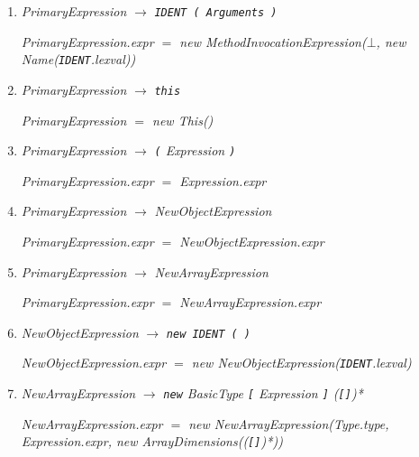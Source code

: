 \documentclass[12pt,a4paper]{scrartcl}
\renewcommand{\prod}[2]{\textit{#1} $\rightarrow$ \textit{#2}}
\newcommand{\tok}[1]{\textnormal{\texttt{#1}}}
\newcommand{\assign}[2]{\textit{#1} $=$ #2}
\newcommand{\new}[2]{\textnormal{new #1(\textit{#2})}}
\newcommand{\attr}[1]{\parbox{\linewidth}{\raggedleft \textit{#1}}}
\begin{document}
\begin{enumerate}
        \attr{\assign{PrimaryExpression.expr}{\new{Name}{\tok{IDENT}.lexval}}}
    \item \prod{PrimaryExpression}{\tok{IDENT \tok{(} Arguments \tok{)}}}\\
        \attr{\assign{PrimaryExpression.expr}{\new{MethodInvocationExpression}{$\bot$, \new{Name}{\tok{IDENT}.lexval}}}}
    \item \prod{PrimaryExpression}{\tok{this}}\\
        \attr{\assign{PrimaryExpression}{\new{This}{}}}
    \item \prod{PrimaryExpression}{\tok{(} Expression \tok{)}}\\
        \attr{\assign{PrimaryExpression.expr}{Expression.expr}}
    \item \prod{PrimaryExpression}{NewObjectExpression}\\
        \attr{\assign{PrimaryExpression.expr}{NewObjectExpression.expr}}
    \item \prod{PrimaryExpression}{NewArrayExpression}\\
        \attr{\assign{PrimaryExpression.expr}{NewArrayExpression.expr}}
    \item \prod{NewObjectExpression}{\tok{new IDENT ( )}}\\
        \attr{\assign{NewObjectExpression.expr}{\new{NewObjectExpression}{\tok{IDENT}.lexval}}}
    \item \prod{NewArrayExpression}{\tok{new} BasicType \tok{[} Expression \tok{]} (\tok{[]})*}\\
        \attr{\assign{NewArrayExpression.expr}{\new{NewArrayExpression}{Type.type, Expression.expr, \new{ArrayDimensions}{(\tok{[]})*}}}}
\end{enumerate}
\end{document}
